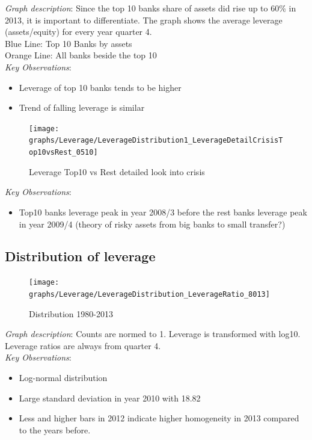 \documentclass[12pt, a4paper]{article} %
\begin{document}
\newpage

\noindent \textit{Graph description}: Since the top 10 banks share of assets did rise up to 60\% in 2013, it is important to differentiate. The graph shows the average leverage (assets/equity) for every year quarter 4.\\ Blue Line: Top 10 Banks by assets\\
Orange Line: All banks beside the top 10\\

\noindent \textit{Key Observations}:
\begin{itemize}
\item Leverage of top 10 banks tends to be higher
\item Trend of falling leverage is similar
\end{itemize}




\begin{figure}[hbtp]
\centering
\caption{Leverage Top10 vs Rest detailed look into crisis}
\texttt{[image: graphs/Leverage/LeverageDistribution1\_LeverageDetailCrisisTop10vsRest\_0510]}
\end{figure}


\noindent \textit{Key Observations}:
\begin{itemize}
\item Top10 banks leverage peak in year 2008/3 before the rest banks leverage peak in year 2009/4 (theory of risky assets from big banks to small transfer?) 
\end{itemize}

\fi


\newpage

\subsection{Distribution of leverage}



\begin{figure}[hbtp]
\centering
\caption{Distribution 1980-2013}
\texttt{[image: graphs/Leverage/LeverageDistribution\_LeverageRatio\_8013]}
\end{figure}

\noindent \textit{Graph description}: Counts are normed to 1. Leverage is transformed with log10. Leverage ratios are always from quarter 4.
\\

\noindent \textit{Key Observations}:
\begin{itemize}
\item Log-normal distribution
\item Large standard deviation in year 2010 with 18.82
\item Less and higher bars in 2012 indicate higher homogeneity in 2013 compared to the years before.
\end{itemize}
\end{document}

